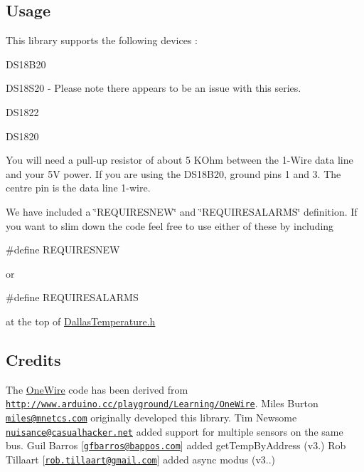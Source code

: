 \subsection*{Usage}

This library supports the following devices \+:


\begin{DoxyItemize}
\item D\+S18\+B20
\item D\+S18\+S20 -\/ Please note there appears to be an issue with this series.
\item D\+S1822
\item D\+S1820
\end{DoxyItemize}

You will need a pull-\/up resistor of about 5 K\+Ohm between the 1-\/\+Wire data line and your 5V power. If you are using the D\+S18\+B20, ground pins 1 and 3. The centre pin is the data line \textquotesingle{}1-\/wire\textquotesingle{}.

We have included a \char`\"{}\+R\+E\+Q\+U\+I\+R\+E\+S\+N\+E\+W\char`\"{} and \char`\"{}\+R\+E\+Q\+U\+I\+R\+E\+S\+A\+L\+A\+R\+M\+S\char`\"{} definition. If you want to slim down the code feel free to use either of these by including

\begin{DoxyVerb}#define REQUIRESNEW 
\end{DoxyVerb}


or \begin{DoxyVerb}#define REQUIRESALARMS
\end{DoxyVerb}


at the top of \hyperlink{_dallas_temperature_8h}{Dallas\+Temperature.\+h}

\subsection*{Credits}

The \hyperlink{class_one_wire}{One\+Wire} code has been derived from \href{http://www.arduino.cc/playground/Learning/OneWire}{\tt http\+://www.\+arduino.\+cc/playground/\+Learning/\+One\+Wire}. Miles Burton \href{mailto:miles@mnetcs.com}{\tt miles@mnetcs.\+com} originally developed this library. Tim Newsome \href{mailto:nuisance@casualhacker.net}{\tt nuisance@casualhacker.\+net} added support for multiple sensors on the same bus. Guil Barros \mbox{[}\href{mailto:gfbarros@bappos.com}{\tt gfbarros@bappos.\+com}\mbox{]} added get\+Temp\+By\+Address (v3.) Rob Tillaart \mbox{[}\href{mailto:rob.tillaart@gmail.com}{\tt rob.\+tillaart@gmail.\+com}\mbox{]} added async modus (v3..)

